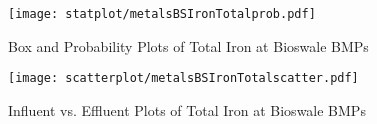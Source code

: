         \begin{figure}[hb]   %
            \centering
            \texttt{[image: statplot/metalsBSIronTotalprob.pdf]}
            \caption{Box and Probability Plots of Total Iron at Bioswale BMPs}
        \end{figure}         %
        
        
        \begin{figure}[hb]   %
            \centering
            \texttt{[image: scatterplot/metalsBSIronTotalscatter.pdf]}
            \caption{Influent vs. Effluent Plots of Total Iron at Bioswale BMPs}
        \end{figure}         %
        \clearpage
        